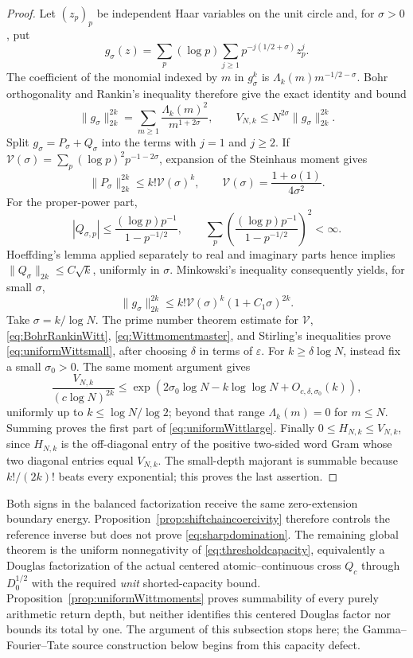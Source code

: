 \documentclass[11pt]{amsart}
\theoremstyle{definition}
\theoremstyle{remark}
\begin{document}
\begin{proof}
Let \((z_p)_p\) be independent Haar variables on the unit circle and, for
\(\sigma>0\), put
\[
 g_\sigma(z)=\sum_p(\log p)\sum_{j\ge1}
 p^{-j(1/2+\sigma)}z_p^j.
\]
The coefficient of the monomial indexed by \(m\) in \(g_\sigma^k\) is
\(\Lambda_k(m)m^{-1/2-\sigma}\).  Bohr orthogonality and Rankin's
inequality therefore give the exact identity and bound
\begin{equation}\label{eq:BohrRankinWitt}
 \|g_\sigma\|_{2k}^{2k}
 =\sum_{m\ge1}\frac{\Lambda_k(m)^2}{m^{1+2\sigma}},
 \qquad
 V_{N,k}\le N^{2\sigma}\|g_\sigma\|_{2k}^{2k}.
\end{equation}
Split \(g_\sigma=P_\sigma+Q_\sigma\) into the terms with \(j=1\) and
\(j\ge2\).  If
\(\mathcal V(\sigma)=\sum_p(\log p)^2p^{-1-2\sigma}\), expansion of the
Steinhaus moment gives
\[
 \|P_\sigma\|_{2k}^{2k}\le k!\mathcal V(\sigma)^k,
 \qquad
 \mathcal V(\sigma)=\frac{1+o(1)}{4\sigma^2}.
\]
For the proper-power part,
\[
 |Q_{\sigma,p}|\le \frac{(\log p)p^{-1}}{1-p^{-1/2}},
 \qquad
 \sum_p\left(\frac{(\log p)p^{-1}}{1-p^{-1/2}}\right)^2<\infty.
\]
Hoeffding's lemma applied separately to real and imaginary parts hence
implies \(\|Q_\sigma\|_{2k}\le C\sqrt k\), uniformly in \(\sigma\).
Minkowski's inequality consequently yields, for small \(\sigma\),
\begin{equation}\label{eq:Wittmomentmaster}
 \|g_\sigma\|_{2k}^{2k}
 \le k!\mathcal V(\sigma)^k(1+C_1\sigma)^{2k}.
\end{equation}
Take \(\sigma=k/\log N\).  The prime number theorem estimate for
\(\mathcal V\), \eqref{eq:BohrRankinWitt},
\eqref{eq:Wittmomentmaster}, and Stirling's inequalities prove
\eqref{eq:uniformWittsmall}, after choosing \(\delta\) in terms of
\(\varepsilon\).  For \(k\ge\delta\log N\), instead fix a small
\(\sigma_0>0\).  The same moment argument gives
\[
 \frac{V_{N,k}}{(c\log N)^{2k}}
 \le \exp\!\left(2\sigma_0\log N-
                 k\log\log N+O_{c,\delta,\sigma_0}(k)\right),
\]
uniformly up to \(k\le\log N/\log2\); beyond that range
\(\Lambda_k(m)=0\) for \(m\le N\).  Summing proves the first part of
\eqref{eq:uniformWittlarge}.  Finally \(0\le H_{N,k}\le V_{N,k}\), since
\(H_{N,k}\) is the off-diagonal entry of the positive two-sided word Gram
whose two diagonal entries equal \(V_{N,k}\).  The small-depth majorant is
summable because \(k!/(2k)!\) beats every exponential; this proves the
last assertion.
\end{proof}

Both signs in the balanced factorization receive the same zero-extension
boundary energy.  Proposition~\ref{prop:shiftchaincoercivity} therefore
controls the reference inverse but does not prove
\eqref{eq:sharpdomination}.  The remaining global theorem is the uniform
nonnegativity of \eqref{eq:thresholdcapacity}, equivalently a Douglas
factorization of the actual centered atomic--continuous cross \(Q_c\)
through \(D_0^{1/2}\) with the required \emph{unit} shorted-capacity bound.
Proposition~\ref{prop:uniformWittmoments} proves summability of every purely
arithmetic return depth, but neither identifies this centered Douglas
factor nor bounds its total by one.  The argument of this subsection stops
here; the Gamma--Fourier--Tate source construction below begins from this
capacity defect.
\end{document}
